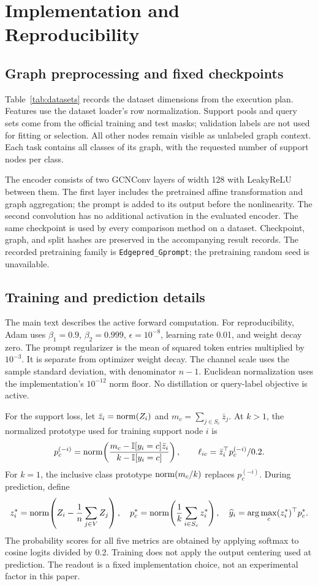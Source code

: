 \section{Implementation and Reproducibility}
\label{app:protocol}
\subsection{Graph preprocessing and fixed checkpoints}
Table~\ref{tab:datasets} records the dataset dimensions from the execution plan. Features use the dataset loader's row normalization. Support pools and query sets come from the official training and test masks; validation labels are not used for fitting or selection. All other nodes remain visible as unlabeled graph context. Each task contains all classes of its graph, with the requested number of support nodes per class.


The encoder consists of two GCNConv layers of width 128 with LeakyReLU between them. The first layer includes the pretrained affine transformation and graph aggregation; the prompt is added to its output before the nonlinearity. The second convolution has no additional activation in the evaluated encoder. The same checkpoint is used by every comparison method on a dataset. Checkpoint, graph, and split hashes are preserved in the accompanying result records. The recorded pretraining family is \texttt{Edgepred\_Gprompt}; the pretraining random seed is unavailable.

\subsection{Training and prediction details}
The main text describes the active forward computation. For reproducibility, Adam uses $\beta_1=0.9$, $\beta_2=0.999$, $\epsilon=10^{-8}$, learning rate 0.01, and weight decay zero. The prompt regularizer is the mean of squared token entries multiplied by $10^{-3}$. It is separate from optimizer weight decay. The channel scale uses the sample standard deviation, with denominator $n-1$. Euclidean normalization uses the implementation's $10^{-12}$ norm floor. No distillation or query-label objective is active.

For the support loss, let $\bar z_i=\operatorname{norm}\!\left(Z_i\right)$ and $m_c=\sum_{j\in S_c}\bar z_j$. At $k>1$, the normalized prototype used for training support node $i$ is
\begin{equation}
p_c^{(-i)}=\operatorname{norm}\!\left(\frac{m_c-\mathbb I[y_i=c]\bar z_i}{k-\mathbb I[y_i=c]}\right),\qquad
\ell_{ic}=\bar z_i^\top p_c^{(-i)}/0.2.
\label{eq:loo}
\end{equation}
For $k=1$, the inclusive class prototype $\operatorname{norm}\!\left(m_c/k\right)$ replaces $p_c^{(-i)}$. During prediction, define
\begin{equation}
z_i^*=\operatorname{norm}\!\left(Z_i-\frac1n\sum_{j\in V}Z_j\right),\quad
p_c^*=\operatorname{norm}\!\left(\frac1k\sum_{i\in S_c}z_i^*\right),\quad
\widehat y_i=\arg\max_c (z_i^*)^\top p_c^*.
\label{eq:predict}
\end{equation}
The probability scores for all five metrics are obtained by applying softmax to cosine logits divided by 0.2. Training does not apply the output centering used at prediction. The readout is a fixed implementation choice, not an experimental factor in this paper.

